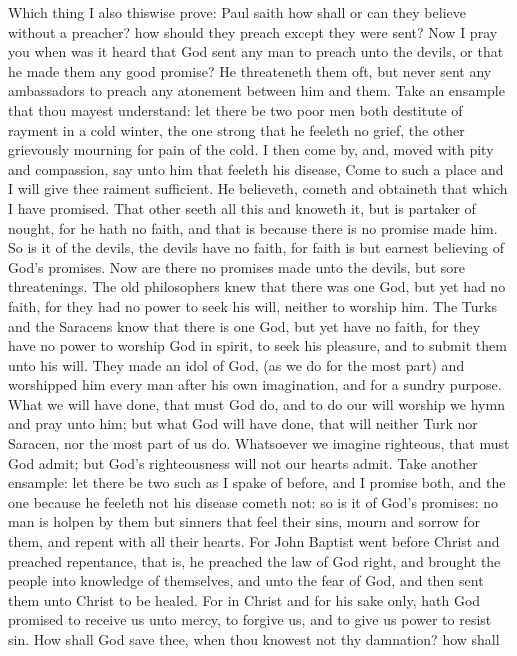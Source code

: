 Which thing I also thiswise prove: Paul saith how 
shall or can they believe without a preacher? how should 
they preach except they were sent? Now I pray you when 
was it heard that God sent any man to preach unto the 
devils, or that he made them any good promise? He threateneth
them oft, but never sent any ambassadors to preach 
any atonement between him and them. Take an ensample
that thou mayest understand: let there be two poor men
both destitute of rayment in a cold winter, the one strong 
that he feeleth no grief, the other grievously mourning for 
pain of the cold. I then come by, and, moved with pity and 
compassion, say unto him that feeleth his disease, Come to 
such a place and I will give thee raiment sufficient. He 
believeth, cometh and obtaineth that which I have promised. 
That other seeth all this and knoweth it, but is partaker of 
nought, for he hath no faith, and that is because there is 
no promise made him. So is it of the devils, the devils have 
no faith, for faith is but earnest believing of God's 
promises. Now are there no promises made unto the devils,
but sore threatenings. The old philosophers knew that 
there was one God, but yet had no faith, for they had
no power to seek his will, neither to worship him. The
Turks and the Saracens know that there is one God, but
yet have no faith, for they have no power to worship God 
in spirit, to seek his pleasure, and to submit them unto his 
will. They made an idol of God, (as we do for the most 
part) and worshipped him every man after his own imagination,
and for a sundry purpose. What we will have 
done, that must God do, and to do our will worship we 
hymn and pray unto him; but what God will have done, 
that will neither Turk nor Saracen, nor the most part of us 
do. Whatsoever we imagine righteous, that must God admit;
but God's righteousness will not our hearts admit. 
Take another ensample: let there be two such as I spake 
of before, and I promise both, and the one because he 
feeleth not his disease cometh not: so is it of God's 
promises: no man is holpen by them but sinners that feel 
their sins, mourn and sorrow for them, and repent with 
all their hearts. For John Baptist went before Christ and 
preached repentance, that is, he preached the law of God 
right, and brought the people into knowledge of themselves,
and unto the fear of God, and then sent them unto 
Christ to be healed. For in Christ and for his sake only, 
hath God promised to receive us unto mercy, to forgive us, 
and to give us power to resist sin. How shall God save 
thee, when thou knowest not thy damnation? how shall 
